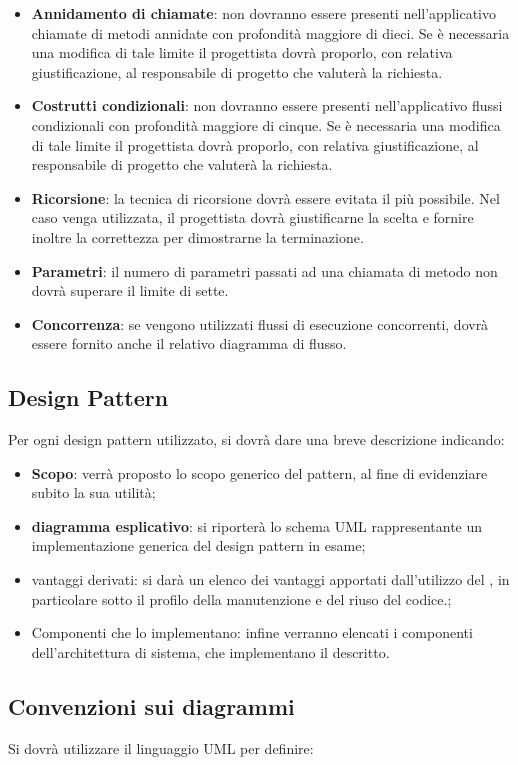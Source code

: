 {\begin{itemize}
\item \textbf{Annidamento di chiamate}: non dovranno essere presenti nell'applicativo chiamate di metodi annidate con profondità maggiore di dieci. Se è necessaria una modifica di tale limite il progettista dovrà proporlo, con relativa giustificazione, al responsabile di progetto che valuterà la richiesta.
\item \textbf{Costrutti condizionali}: non dovranno essere presenti nell'applicativo flussi condizionali con profondità maggiore di cinque. Se è necessaria una modifica di tale limite il progettista dovrà proporlo, con relativa giustificazione, al responsabile di progetto che valuterà la richiesta.
\item \textbf{Ricorsione}: la tecnica di ricorsione dovrà essere evitata il più possibile. Nel caso venga utilizzata, il progettista dovrà giustificarne la scelta e fornire inoltre la correttezza per dimostrarne la terminazione.
\item \textbf{Parametri}: il numero di parametri passati ad una chiamata di metodo non dovrà superare il limite di sette.
\item \textbf{Concorrenza}: se vengono utilizzati flussi di esecuzione concorrenti, dovrà essere fornito anche il relativo diagramma di flusso.
\end{itemize}

\subsection{Design Pattern}
\label{sec:design_patterns}
Per ogni design pattern utilizzato, si dovrà dare una breve descrizione indicando:
\begin{itemize}
\item \textbf{Scopo}: verrà proposto lo scopo generico del pattern, al fine di evidenziare subito la sua utilità;
\item \textbf{diagramma esplicativo}: si riporterà lo schema UML rappresentante un implementazione generica del design pattern in esame;
\item vantaggi derivati: si darà un elenco dei vantaggi apportati dall'utilizzo del , in particolare sotto il profilo della manutenzione e del riuso del codice.;
\item Componenti che lo implementano: infine verranno elencati i componenti dell'architettura di sistema, che implementano il  descritto.
\end{itemize}

\subsection{Convenzioni sui diagrammi}
Si dovrà utilizzare il linguaggio UML per definire:
\begin{itemize}


\end{itemize}}
